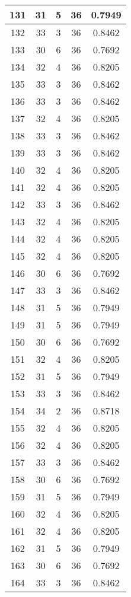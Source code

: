 \documentclass[letterpaper, 12pt]{article}
\begin{document}
\begin{longtable}{|c|c|c|c|c|}
\hline
131 & 31 & 5 & 36 & 0.7949 \\
\hline
132 & 33 & 3 & 36 & 0.8462 \\
\hline
133 & 30 & 6 & 36 & 0.7692 \\
\hline
134 & 32 & 4 & 36 & 0.8205 \\
\hline
135 & 33 & 3 & 36 & 0.8462 \\
\hline
136 & 33 & 3 & 36 & 0.8462 \\
\hline
137 & 32 & 4 & 36 & 0.8205 \\
\hline
138 & 33 & 3 & 36 & 0.8462 \\
\hline
139 & 33 & 3 & 36 & 0.8462 \\
\hline
140 & 32 & 4 & 36 & 0.8205 \\
\hline
141 & 32 & 4 & 36 & 0.8205 \\
\hline
142 & 33 & 3 & 36 & 0.8462 \\
\hline
143 & 32 & 4 & 36 & 0.8205 \\
\hline
144 & 32 & 4 & 36 & 0.8205 \\
\hline
145 & 32 & 4 & 36 & 0.8205 \\
\hline
146 & 30 & 6 & 36 & 0.7692 \\
\hline
147 & 33 & 3 & 36 & 0.8462 \\
\hline
148 & 31 & 5 & 36 & 0.7949 \\
\hline
149 & 31 & 5 & 36 & 0.7949 \\
\hline
150 & 30 & 6 & 36 & 0.7692 \\
\hline
151 & 32 & 4 & 36 & 0.8205 \\
\hline
152 & 31 & 5 & 36 & 0.7949 \\
\hline
153 & 33 & 3 & 36 & 0.8462 \\
\hline
154 & 34 & 2 & 36 & 0.8718 \\
\hline
155 & 32 & 4 & 36 & 0.8205 \\
\hline
156 & 32 & 4 & 36 & 0.8205 \\
\hline
157 & 33 & 3 & 36 & 0.8462 \\
\hline
158 & 30 & 6 & 36 & 0.7692 \\
\hline
159 & 31 & 5 & 36 & 0.7949 \\
\hline
160 & 32 & 4 & 36 & 0.8205 \\
\hline
161 & 32 & 4 & 36 & 0.8205 \\
\hline
162 & 31 & 5 & 36 & 0.7949 \\
\hline
163 & 30 & 6 & 36 & 0.7692 \\
\hline
164 & 33 & 3 & 36 & 0.8462 \\

\end{longtable}
\end{document}
